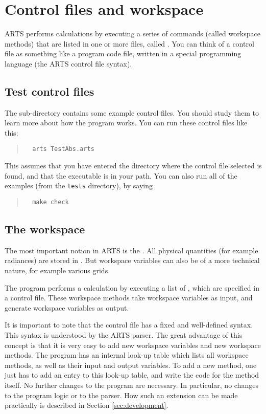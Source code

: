 \section{Control files and workspace}

ARTS performs calculations by executing a series of commands (called
workspace methods) that are listed in one or more files, called
. You can think of a control file as something like a
program code file, written in a special programming language (the ARTS
control file syntax).

\subsection{Test control files}

The sub-directory  contains some example control files.
You should study them to learn more about how the program works. You
can run these control files like this:
\begin{quote}
\begin{verbatim}
  arts TestAbs.arts
\end{verbatim}
\end{quote}
This assumes that you have entered the directory where the control
file selected is found, and that the  executable is in
your path. You can also run all of the examples (from the \verb|tests|
directory), by saying
\begin{quote}
\begin{verbatim}
  make check
\end{verbatim}
\end{quote}


\subsection{The workspace}

The most important notion in ARTS is the . All
physical quantities (for example radiances) are stored in
. But workspace variables can also be
of a more technical nature, for example various grids.

The program performs a calculation by executing a list of
, which are specified in a control file.
These workspace methods take workspace variables as input, and
generate workspace variables as output.

It is important to note that the control file has a fixed and
well-defined syntax. This syntax is understood by the ARTS parser.
The great advantage of this concept is that it is very easy to add new
workspace variables and new workspace methods. The program has an
internal look-up table which lists all workspace methods, as well as
their input and output variables. To add a new method, one just has to
add an entry to this look-up table, and write the code for the method
itself. No further changes to the program are necessary. In
particular, no changes to the program logic or to the parser. How such
an extension can be made practically is described in Section
\ref{sec:development}.



